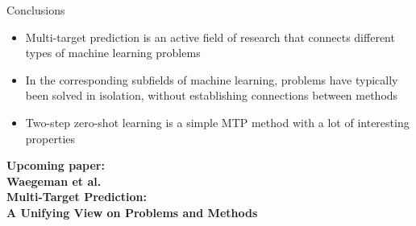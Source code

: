 \documentclass[]{beamer}
\begin{document}
\begin{frame}{Conclusions}

\begin{itemize}
\item Multi-target prediction is an active field of research that connects different types of machine learning problems
\item In the corresponding subfields of machine learning, problems have typically been solved in isolation, without establishing connections between methods
\item Two-step zero-shot learning is a simple MTP method with a lot of interesting properties
\end{itemize}

\begin{center}
{\bf Upcoming paper: \\
Waegeman et al. \\ Multi-Target Prediction: \\ A Unifying View on Problems and Methods}

\end{center}

\end{frame}

%
%
\end{document}
